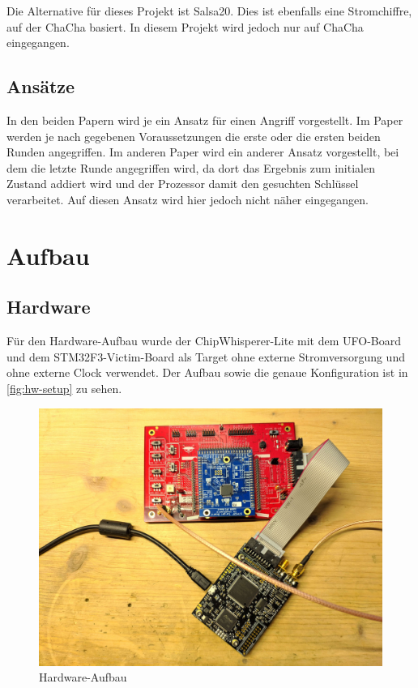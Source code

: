\documentclass[a4paper,ngerman]{scrreprt}
\begin{document}
Die Alternative für dieses Projekt ist Salsa20. Dies ist ebenfalls eine
Stromchiffre, auf der ChaCha basiert. In diesem Projekt wird jedoch nur auf
ChaCha eingegangen.


\section{Ansätze}

In den beiden Papern \cite{adomnicai_fournier_masson_2017,jungk_bhasin_2017}
wird je ein Ansatz für einen Angriff vorgestellt. Im Paper
\cite{jungk_bhasin_2017} werden je nach gegebenen Voraussetzungen die erste oder
die ersten beiden Runden angegriffen. Im anderen Paper
\cite{adomnicai_fournier_masson_2017} wird ein anderer Ansatz vorgestellt, bei
dem die letzte Runde angegriffen wird, da dort das Ergebnis zum initialen
Zustand addiert wird und der Prozessor damit den gesuchten Schlüssel
verarbeitet. Auf diesen Ansatz wird hier jedoch nicht näher eingegangen.




\chapter{Aufbau}

\section{Hardware}
\label{sec:hw-setup}

Für den Hardware-Aufbau wurde der ChipWhisperer-Lite mit dem UFO-Board und dem
STM32F3-Victim-Board als Target ohne externe Stromversorgung und ohne externe
Clock verwendet. Der Aufbau sowie die genaue Konfiguration ist in
\autoref{fig:hw-setup} zu sehen.

\begin{figure}[H]
    \caption{Hardware-Aufbau}
    \label{fig:hw-setup}

    \includegraphics[width=\textwidth]{img/hw_setup.jpg}
\end{figure}
\end{document}
